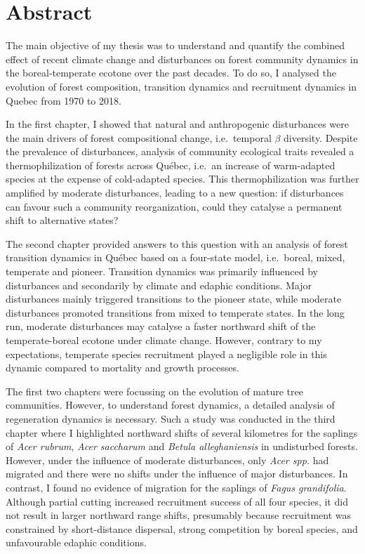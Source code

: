 \anglais

\chapter*{Abstract}

The main objective of my thesis was to understand and quantify the
combined effect of recent climate change and disturbances on forest
community dynamics in the boreal-temperate ecotone over the past
decades. To do so, I analysed the evolution of forest composition,
transition dynamics and recruitment dynamics in Quebec from 1970 to
2018.

In the first chapter, I showed that natural and anthropogenic
disturbances were the main drivers of forest compositional change,
i.e.~temporal \(\beta\) diversity. Despite the prevalence of
disturbances, analysis of community ecological traits revealed a
thermophilization of forests across Québec, i.e.~an increase of
warm-adapted species at the expense of cold-adapted species. This
thermophilization was further amplified by moderate disturbances,
leading to a new question: if disturbances can favour such a community
reorganization, could they catalyse a permanent shift to alternative
states?

The second chapter provided answers to this question with an analysis of
forest transition dynamics in Québec based on a four-state model,
i.e.~boreal, mixed, temperate and pioneer. Transition dynamics was
primarily influenced by disturbances and secondarily by climate and
edaphic conditions. Major disturbances mainly triggered transitions to
the pioneer state, while moderate disturbances promoted transitions from
mixed to temperate states. In the long run, moderate disturbances may
catalyse a faster northward shift of the temperate-boreal ecotone under
climate change. However, contrary to my expectations, temperate species
recruitment played a negligible role in this dynamic compared to
mortality and growth processes.

The first two chapters were focussing on the evolution of mature tree
communities. However, to understand forest dynamics, a detailed analysis
of regeneration dynamics is necessary. Such a study was conducted in the
third chapter where I highlighted northward shifts of several kilometres
for the saplings of \emph{Acer rubrum}, \emph{Acer saccharum} and
\emph{Betula alleghaniensis} in undisturbed forests. However, under the
influence of moderate disturbances, only \emph{Acer spp.} had migrated
and there were no shifts under the influence of major disturbances. In
contrast, I found no evidence of migration for the saplings of
\emph{Fagus grandifolia}. Although partial cutting increased recruitment
success of all four species, it did not result in larger northward range
shifts, presumably because recruitment was constrained by short-distance
dispersal, strong competition by boreal species, and unfavourable
edaphic conditions.

